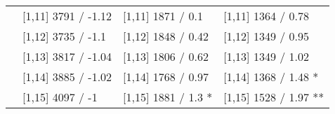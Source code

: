 \begin{table}
\begin{tabular}[t]{llll}
 & {}[1,11] 3791  / -1.12 & {}[1,11] 1871  / 0.1 & {}[1,11] 1364  / 0.78\\
 & {}[1,12] 3735  / -1.1 & {}[1,12] 1848  / 0.42 & {}[1,12] 1349  / 0.95\\
\addlinespace
 & {}[1,13] 3817  / -1.04 & {}[1,13] 1806  / 0.62 & {}[1,13] 1349  / 1.02\\
 & {}[1,14] 3885  / -1.02 & {}[1,14] 1768  / 0.97 & {}[1,14] 1368  / 1.48 *\\
 & {}[1,15] 4097  / -1 & {}[1,15] 1881  / 1.3 * & {}[1,15] 1528  / 1.97 **\\
\bottomrule
\end{tabular}
\end{table}
